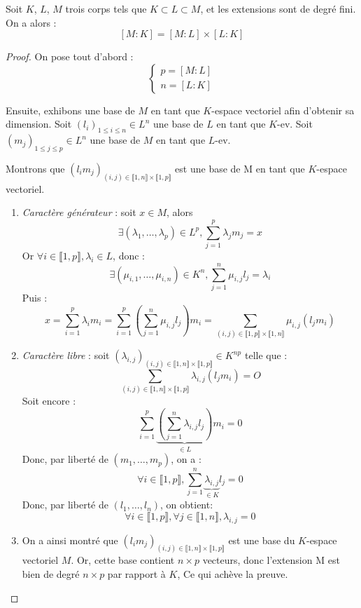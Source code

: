 \documentclass[a4paper,12pt,french,draft]{report}
\begin{document}
			\begin{proposition}
				Soit \(K\), \(L\), \(M\) trois corps tels que \( K \subset L \subset M\), et les extensions sont de degré fini. On a alors :
				\[
				[M:K] = [M:L]{\times} [L:K]
				\]
			\end{proposition}
				\begin{proof}
					On pose tout d'abord :
					\[
					\left\{
						\begin{array}{ll}
							p = [M:L] \\
							n = [L:K]
						\end{array}
					\right.
					\]
					
					
					Ensuite, exhibons une base de \(M\) en tant que \(K\)-espace vectoriel afin d'obtenir sa dimension.
					Soit \((l_i)_{1 \leq i \leq n} \in L^n\) une base de \(L\) en tant que \(K\)-ev.
					Soit \((m_j)_{1 \leq j \leq p} \in L^n\) une base de \(M\) en tant que \(L\)-ev.
					
					Montrons que \((l_i m_j)_{(i, j) \in \llbracket 1, n \rrbracket \times \llbracket 1, p \rrbracket}\) est une base de M en tant que \(K\)-espace vectoriel.
					\begin{enumerate}
					\item \emph{Caractère générateur} : soit \(x \in M\), alors 
						\[
						\exists (\lambda_1, \dots, \lambda_p) \in L^p, \sum_{j  = 1}^{p} \lambda_j m_j = x
						\]
						Or \(\forall i \in \llbracket 1, p \rrbracket, \lambda_i \in L\), donc :
						\[ 
						\exists (\mu_{i, 1}, \dots, \mu_{i, n}) \in K^n, \sum_{j  = 1}^{n} \mu_{i, j} l_j = \lambda_i 
						\]
						Puis :
						\[
						x 	= \sum_{i  = 1}^{p} \lambda_i m_i  
							= \sum_{i  = 1}^{p} \left(\sum_{j  = 1}^{n} \mu_{i, j} l_j\right) m_i 
							= \sum_{(i, j) \in \llbracket 1, p \rrbracket \times \llbracket 1, n \rrbracket}\mu_{i, j} (l_j m_i)
						\]
					\item \emph{Caractère libre} : soit \((\lambda_{i, j})_{ (i, j) \in \llbracket 1, n \rrbracket \times \llbracket 1, p \rrbracket} \in K^{np}\) telle que :
							\[
							\sum_{(i, j) \in \llbracket 1, n \rrbracket \times \llbracket 1, p \rrbracket} \lambda_{i, j} (l_j m_i) = O
							\]
						Soit encore :
							\[
							\sum_{i=1}^{p} \underbrace{\left( \sum_{j = 1}^{n} \lambda_{i, j} l_j \right)}_{\in L}m_i = 0
							\]
						Donc, par liberté de \((m_1, \dots, m_p)\), on a :
							\[
							\forall i \in \llbracket 1, p \rrbracket, \sum_{j = 1}^{n} \underbrace{\lambda_{i, j}}_{\in K} l_j = 0
							\]
						Donc, par liberté de \((l_1, \dots, l_n)\), on obtient:
							\[
							\forall i \in \llbracket 1, p \rrbracket, \forall j \in \llbracket 1, n \rrbracket, \lambda_{i, j} = 0
							\]
					\item On a ainsi montré que \((l_i m_j)_{(i, j) \in \llbracket 1, n \rrbracket \times \llbracket 1, p \rrbracket}\) est une base du \(K\)-espace vectoriel \(M\). Or, cette base contient \(n\times p\) vecteurs, donc l'extension M est bien de degré \(n\times p\) par rapport à \(K\), Ce qui achève la preuve. \( \)
					
					\end{enumerate}
				\end{proof}
    
\end{document}
